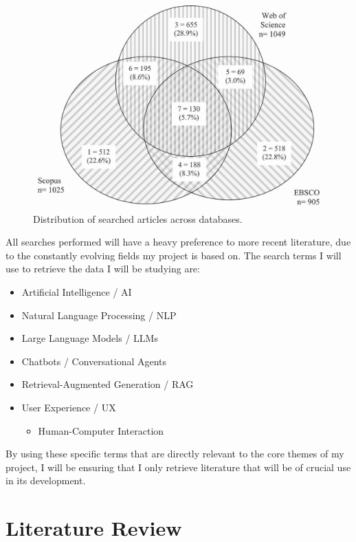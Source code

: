 \documentclass[12pt]{report}
\begin{document}
    \begin{figure}[H]
        \centering
        \includegraphics[width=.7\linewidth]{litSearchDBs.jpg}
        \caption{Distribution of searched articles across databases. \autocite{litSearch}}
        \label{fig:litSearch}
    \end{figure}

    \pagebreak 

    \noindent 
    All searches performed will have a heavy preference 
    to more recent literature, due to the constantly evolving fields my project is based on. 
    The search terms I will use to retrieve the data I will be studying are:

    \begin{itemize}
        \item Artificial Intelligence / AI 
        \item Natural Language Processing / NLP
        \item Large Language Models / LLMs
        \item Chatbots / Conversational Agents
        \item Retrieval-Augmented Generation / RAG
        \item User Experience / UX
            \begin{itemize}
                \item Human-Computer Interaction
            \end{itemize}
    \end{itemize}

    \noindent
    By using these specific terms that are directly relevant to the core themes of my project,
    I will be ensuring that I only retrieve literature that will be of crucial use in its 
    development.


    \chapter{Literature Review}
\end{document}
